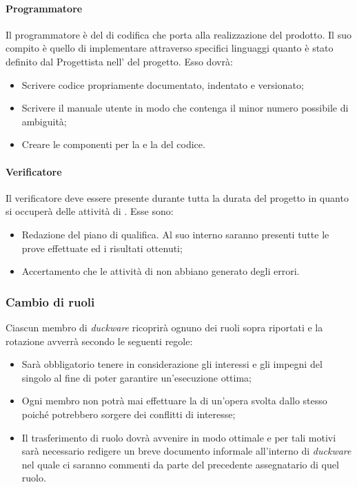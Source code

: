 \paragraph{Programmatore}
Il programmatore è  del  di codifica che porta alla realizzazione del prodotto. Il suo compito è quello di implementare attraverso specifici linguaggi quanto è stato definito dal Progettista nell’ del progetto. Esso dovrà:
\begin{itemize}
    \item Scrivere codice propriamente documentato, indentato e versionato;
    \item Scrivere il manuale utente in modo che contenga il minor numero possibile di ambiguità;
    \item Creare le componenti per la  e la  del codice.
\end{itemize}

\paragraph{Verificatore}
Il verificatore deve essere presente durante tutta la durata del progetto in quanto si occuperà delle attività di . Esse sono:
\begin{itemize}
    \item Redazione del piano di qualifica. Al suo interno saranno presenti tutte le prove effettuate ed i risultati ottenuti;
    \item Accertamento  che le attività di  non abbiano generato degli errori.
\end{itemize}

\subsubsection{Cambio di ruoli}
Ciascun membro di \emph{duckware} ricoprirà ognuno dei ruoli sopra riportati e la rotazione avverrà secondo le seguenti regole:
\begin{itemize}
    \item Sarà obbligatorio tenere in considerazione gli interessi e gli impegni del singolo al fine di poter garantire un’esecuzione ottima;
    \item Ogni membro non potrà mai effettuare la  di un’opera svolta dallo stesso poiché potrebbero sorgere dei conflitti di interesse;
    \item Il trasferimento di ruolo dovrà avvenire in modo ottimale e per tali motivi sarà necessario redigere un breve documento informale all’interno di \emph{duckware} nel quale ci saranno commenti da parte del precedente assegnatario di quel ruolo.
\end{itemize}

